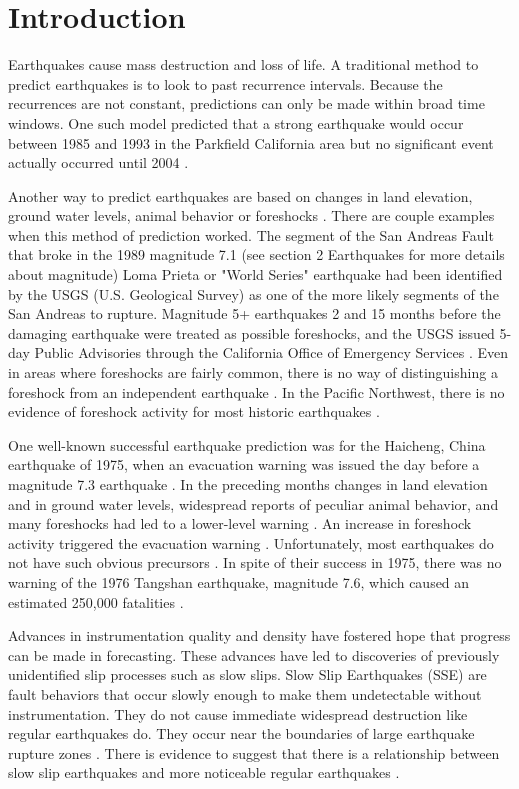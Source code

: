 \documentclass[]{llncs} %
\begin{document}
\section{Introduction}
Earthquakes cause mass destruction and loss of life. A traditional method to predict earthquakes is to look to past recurrence intervals. Because the recurrences are not constant, predictions can only be made within broad time windows. One such model predicted that a strong earthquake would occur between 1985 and 1993 in the Parkfield California area but no significant event actually occurred until 2004 \cite{Jackson}. \par
Another way to predict earthquakes are based on changes in land elevation, ground water levels, animal behavior or foreshocks \cite{PNSN}. There are couple examples when this method of prediction worked. The segment of the San Andreas Fault that broke in the 1989 magnitude 7.1  (see section 2 Earthquakes for more details about magnitude) Loma Prieta or "World Series" earthquake had been identified by the USGS (U.S. Geological Survey) as one of the more likely segments of the San Andreas to rupture. Magnitude 5+ earthquakes 2 and 15 months before the damaging earthquake were treated as possible foreshocks, and the USGS issued 5-day Public Advisories through the California Office of Emergency Services \cite{PNSN}. Even in areas where foreshocks are fairly common, there is no way of distinguishing a foreshock from an independent earthquake \cite{PNSN}. In the Pacific Northwest, there is no evidence of foreshock activity for most historic earthquakes \cite{PNSN}.\par
One well-known successful earthquake prediction was for the Haicheng, China earthquake of 1975, when an evacuation warning was issued the day before a magnitude 7.3 earthquake \cite{PNSN}. In the preceding months changes in land elevation and in ground water levels, widespread reports of peculiar animal behavior, and many foreshocks had led to a lower-level warning \cite{PNSN}. An increase in foreshock activity triggered the evacuation warning \cite{PNSN}. Unfortunately, most earthquakes do not have such obvious precursors \cite{PNSN}. In spite of their success in 1975, there was no warning of the 1976 Tangshan earthquake, magnitude 7.6, which caused an estimated 250,000 fatalities \cite{PNSN}.\par
Advances in instrumentation quality and density have fostered hope that progress can be made in forecasting. These advances have led to discoveries of previously unidentified slip processes such as slow slips. Slow Slip Earthquakes (SSE) are fault behaviors that occur slowly enough to make them undetectable without instrumentation. They do not cause immediate widespread destruction like regular earthquakes do. They occur near the boundaries of large earthquake rupture zones \cite{Slip}. There is evidence to suggest that there is a relationship between slow slip earthquakes and more noticeable regular earthquakes \cite{SlowSlip}. \par
\end{document}
